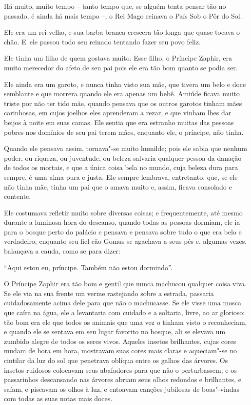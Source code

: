  

Há muito, muito tempo -- tanto tempo que, se alguém tenta pensar tão no
passado, é ainda há mais tempo --, o Rei Mago reinava o País Sob o Pôr
do Sol.

Ele era um rei velho, e sua barba branca crescera tão longa que quase
tocava o chão. E~ele passou todo seu reinado tentando fazer seu povo
feliz.

Ele tinha um filho de quem gostava muito. Esse filho, o Príncipe Zaphir,
era muito merecedor do afeto de seu pai pois ele era tão bom quanto se
podia ser.

Ele ainda era um garoto, e nunca tinha visto sua mãe, que tivera um belo
e doce semblante e que morrera quando ele era apenas um bebê. Amiúde
ficava muito triste por não ter tido mãe, quando pensava que os outros
garotos tinham mães carinhosas, em cujos joelhos eles aprenderam a
rezar, e que vinham lhes dar beijos à noite em suas camas. Ele sentia
que era estranho muitas das pessoas pobres nos domínios de seu pai terem
mães, enquanto ele, o príncipe, não tinha.

Quando ele pensava assim, tornava"-se muito humilde; pois ele sabia que
nenhum poder, ou riqueza, ou juventude, ou beleza salvaria qualquer
pessoa da danação de todos os mortais, e que a única coisa bela no
mundo, cuja beleza dura para sempre, é uma alma pura e justa. Ele sempre
lembrava, entretanto, que, se ele não tinha mãe, tinha um pai que o
amava muito e, assim, ficava consolado e contente.

Ele costumava refletir muito sobre diversas coisas; e frequentemente,
até mesmo durante a luminosa hora do descanso, quando todas as pessoas
dormiam, ele ia para o bosque perto do palácio e pensava e pensava sobre
tudo o que era belo e verdadeiro, enquanto seu fiel cão Gomus se
agachava a seus pés e, algumas vezes, balançava a cauda, como se para
dizer:

``Aqui estou eu, príncipe. Também não estou dormindo''.

O Príncipe Zaphir era tão bom e gentil que nunca machucou qualquer coisa
viva. Se ele via na sua frente um verme rastejando sobre a estrada,
passaria cuidadosamente acima dele para que não o machucasse. Se ele
visse uma mosca que caíra na água, ele a levantaria com cuidado e a
soltaria, livre, ao ar glorioso: tão bom era ele que todos os animais
que uma vez o tinham visto o reconheciam, e quando ele se sentava em seu
lugar favorito no bosque, ali se elevava um zumbido alegre de todos os
seres vivos. Aqueles insetos brilhantes, cujas cores mudam de hora em
hora, mostravam suas cores mais claras e aqueciam"-se no cintilar da luz
do sol que penetrava oblíqua entre os galhos das árvores. Os insetos
ruidosos colocavam seus abafadores para que não o perturbassem; e os
passarinhos descansando nas árvores abriam seus olhos redondos e
brilhantes, e saíam, e piscavam os olhos à luz, e entoavam canções
jubilosas de boas"-vindas com todas as suas notas mais doces.

